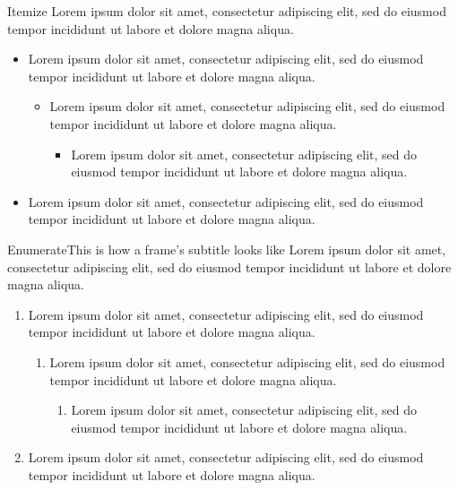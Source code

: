 \documentclass[numbertotal,toc,wide]{../bpslides}
\begin{document}
\begin{frame}{Itemize}
Lorem ipsum dolor sit amet, consectetur adipiscing elit, sed do eiusmod tempor incididunt ut labore et dolore magna aliqua. 
	\begin{itemize}
		\item Lorem ipsum dolor sit amet, consectetur adipiscing elit, sed do eiusmod tempor incididunt ut labore et dolore magna aliqua.
		\begin{itemize}
			\item Lorem ipsum dolor sit amet, consectetur adipiscing elit, sed do eiusmod tempor incididunt ut labore et dolore magna aliqua.
			\begin{itemize}
				\item Lorem ipsum dolor sit amet, consectetur adipiscing elit, sed do eiusmod tempor incididunt ut labore et dolore magna aliqua.
			\end{itemize}
		\end{itemize}
		\item Lorem ipsum dolor sit amet, consectetur adipiscing elit, sed do eiusmod tempor incididunt ut labore et dolore magna aliqua.
	\end{itemize}
\end{frame}

\begin{frame}{Enumerate}{This is how a frame's subtitle looks like}
Lorem ipsum dolor sit amet, consectetur adipiscing elit, sed do eiusmod tempor incididunt ut labore et dolore magna aliqua. 
	\begin{enumerate}
		\item Lorem ipsum dolor sit amet, consectetur adipiscing elit, sed do eiusmod tempor incididunt ut labore et dolore magna aliqua.
		\begin{enumerate}
			\item Lorem ipsum dolor sit amet, consectetur adipiscing elit, sed do eiusmod tempor incididunt ut labore et dolore magna aliqua. 
			\begin{enumerate}
				\item Lorem ipsum dolor sit amet, consectetur adipiscing elit, sed do eiusmod tempor incididunt ut labore et dolore magna aliqua. 
			\end{enumerate}
		\end{enumerate}
		\item Lorem ipsum dolor sit amet, consectetur adipiscing elit, sed do eiusmod tempor incididunt ut labore et dolore magna aliqua. 
	\end{enumerate}
\end{frame}
\end{document}

